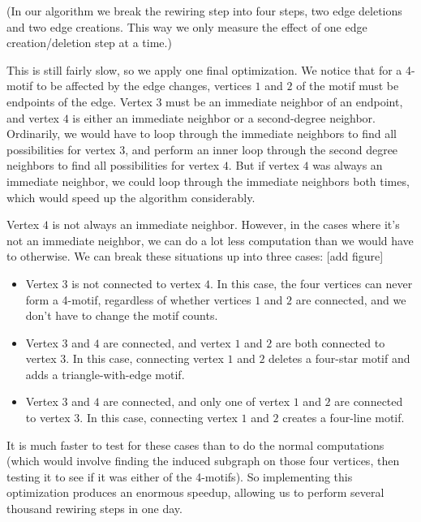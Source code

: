 (In our algorithm we break the rewiring step into four steps, two edge deletions and two edge creations.  This way we only measure the effect of one edge creation/deletion step at a time.)

This is still fairly slow, so we apply one final optimization.  We notice that for a 4-motif to be affected by the edge changes, vertices $1$ and $2$ of the motif must be endpoints of the edge.  Vertex $3$ must be an immediate neighbor of an endpoint, and vertex $4$ is either an immediate neighbor or a second-degree neighbor.  Ordinarily, we would have to loop through the immediate neighbors to find all possibilities for vertex $3$, and perform an inner loop through the second degree neighbors to find all possibilities for vertex $4$.  But if vertex $4$ was always an immediate neighbor, we could loop through the immediate neighbors both times, which would speed up the algorithm considerably.

Vertex $4$ is not always an immediate neighbor.  However, in the cases where it's not an immediate neighbor, we can do a lot less computation than we would have to otherwise.  We can break these situations up into three cases: [add figure]

\begin{itemize}
\item Vertex $3$ is not connected to vertex $4$.  In this case, the four vertices can never form a 4-motif, regardless of whether vertices $1$ and $2$ are connected, and we don't have to change the motif counts.
\item Vertex $3$ and $4$ are connected, and vertex $1$ and $2$ are both connected to vertex $3$.  In this case, connecting vertex $1$ and $2$ deletes a four-star motif and adds a triangle-with-edge motif.
\item Vertex $3$ and $4$ are connected, and only one of vertex $1$ and $2$ are connected to vertex $3$.  In this case, connecting vertex $1$ and $2$ creates a four-line motif.
\end{itemize}

It is much faster to test for these cases than to do the normal computations (which would involve finding the induced subgraph on those four vertices, then testing it to see if it was either of the 4-motifs).  So implementing this optimization produces an enormous speedup, allowing us to perform several thousand rewiring steps in one day.
